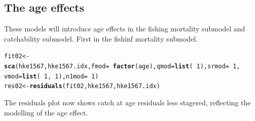 \documentclass[a4paper,english,11pt]{article}\usepackage[]{graphicx}\usepackage[]{xcolor}
\makeatletter
\newcommand{\hlnum}[1]{\textcolor[rgb]{0.686,0.059,0.569}{#1}}%
\newcommand{\hlopt}[1]{\textcolor[rgb]{0,0,0}{#1}}%
\newcommand{\hldef}[1]{\textcolor[rgb]{0.345,0.345,0.345}{#1}}%
\newcommand{\hlkwb}[1]{\textcolor[rgb]{0.69,0.353,0.396}{#1}}%
\newcommand{\hlkwc}[1]{\textcolor[rgb]{0.333,0.667,0.333}{#1}}%
\newcommand{\hlkwd}[1]{\textcolor[rgb]{0.737,0.353,0.396}{\textbf{#1}}}%
\newenvironment{kframe}{%
 \def\at@end@of@kframe{}%
 \ifinner\ifhmode%
  \def\at@end@of@kframe{\end{minipage}}%
  \begin{minipage}{\columnwidth}%
 \fi\fi%
 \def\FrameCommand##1{\hskip\@totalleftmargin \hskip-\fboxsep
 \colorbox{shadecolor}{##1}\hskip-\fboxsep
     \hskip-\linewidth \hskip-\@totalleftmargin \hskip\columnwidth}%
 \MakeFramed {\advance\hsize-\width
   \@totalleftmargin\z@ \linewidth\hsize
   \@setminipage}}%
 {\par\unskip\endMakeFramed%
 \at@end@of@kframe}
\newenvironment{knitrout}{}{} %
\makeatother
\begin{document}
\subsection{The age effects}

These models will introduce age effects in the fishing mortality submodel and catchability submodel. First in the fishinf mortality submodel.

\begin{knitrout}
\color{fgcolor}\begin{kframe}
\begin{alltt}
\hldef{fit02} \hlkwb{<-} \hlkwd{sca}\hldef{(hke1567, hke1567.idx,} \hlkwc{fmod} \hldef{=} \hlopt{~}\hlkwd{factor}\hldef{(age),} \hlkwc{qmod} \hldef{=} \hlkwd{list}\hldef{(}\hlopt{~}\hlnum{1}\hldef{),} \hlkwc{srmod} \hldef{=} \hlopt{~}\hlnum{1}\hldef{,}
    \hlkwc{vmod} \hldef{=} \hlkwd{list}\hldef{(}\hlopt{~}\hlnum{1}\hldef{,} \hlopt{~}\hlnum{1}\hldef{),} \hlkwc{n1mod} \hldef{=} \hlopt{~}\hlnum{1}\hldef{)}
\hldef{res02} \hlkwb{<-} \hlkwd{residuals}\hldef{(fit02, hke1567, hke1567.idx)}
\end{alltt}
\end{kframe}
\end{knitrout}

The residuals plot now shows catch at age residuals less stagered, reflecting the modelling of the age effect. 
\end{document}
